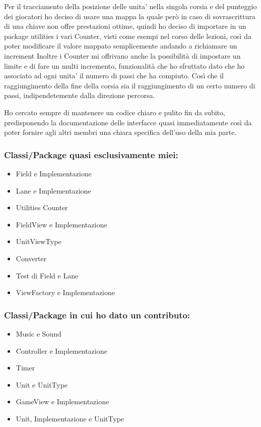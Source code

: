\documentclass[a4paper,12pt]{report}
\begin{document}
Per il tracciamento della posizione delle unita’ nella singola corsia e del punteggio dei giocatori ho deciso di usare una mappa la quale però in caso
di sovrascrittura di una chiave non offre prestazioni ottime, quindi ho deciso di importare in un package utilities i vari Counter,
visti come esempi nel corso delle lezioni, così da poter modificare il valore mappato semplicemente andando a richiamare un increment
Inoltre i Counter mi offrivano anche la possibilità di impostare un limite e di fare un multi incremento, funzionalità che ho 
sfruttato dato che ho associato ad ogni unita’ il numero di passi che ha compiuto. Così che il raggiungimento della fine della 
corsia sia il raggiungimento di un certo numero di passi, indipendetemente dalla direzione percorsa.

Ho cercato sempre di mantenere un codice chiaro e pulito fin da subito, predisponendo la documentazione delle interfacce
quasi immediatamente così da poter fornire agli altri membri una chiara specifica dell'uso della mia parte.

\subsubsection{Classi/Package quasi esclusivamente miei:}
\begin{itemize}
	\item Field e Implementazione
	\item Lane e Implementazione 
	\item Utilities Counter
	\item FieldView e Implementazione
	\item UnitViewType
	\item Converter
	\item Test di Field e Lane
	\item ViewFactory e Implementazione
\end{itemize}

\subsubsection{Classi/Package in cui ho dato un contributo:}
\begin{itemize}
	\item Music e Sound
	\item Controller e Implementazione
	\item Timer
	\item Unit e UnitType
	\item GameView e Implementazione
	\item Unit, Implementazione e UnitType
\end{itemize}
\end{document}
